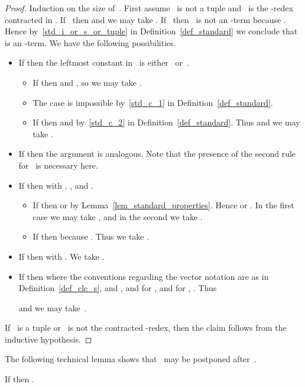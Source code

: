 \documentclass[a4paper,UKenglish]{lipics-v2016}
\begin{document}
\begin{proof}
  Induction on the size of~. First assume~ is not a tuple
  and~ is the -redex contracted in . If~ then  and we may take
  . If~ then~ is not an -term
  because . Hence by~\ref{std_i_or_s_or_tuple} in
  Definition~\ref{def_standard} we conclude that~ is an
  -term. We have the following possibilities.
  \begin{itemize}
  \item If  then the
    leftmost constant in~ is either~ or~.
    \begin{itemize}
    \item If  then  and
      , so we may take .
    \item The case  is impossible
      by~\ref{std_c_1} in Definition~\ref{def_standard}.
    \item If  then 
      and  by~\ref{std_c_2} in
      Definition~\ref{def_standard}. Thus  and we may
      take .
    \end{itemize}
  \item If  then the
    argument is analogous. Note that the presence of the second rule
    for~ is necessary here.
  \item If  then  with , ,
     and .
    \begin{itemize}
    \item If  then  or  by Lemma~\ref{lem_standard_properties}. Hence  or . In the first case we may
      take , and in the second we take .
    \item If  then  because
      . Thus we take .
    \end{itemize}
  \item If  then
     with . We
    take .
  \item If 
    then
     where the conventions regarding
    the vector notation are as in Definition~\ref{def_clc_s}, and
    , and  for
    , and  for ,
    . Thus
    
    and we may take~.
  \end{itemize}
  If~ is a tuple or~ is not the contracted -redex, then
  the claim follows from the inductive hypothesis.
\end{proof}

The following technical lemma shows that~ may be postponed
after~.

\begin{lemma}\label{lem_i_postpone}
  If  then
  .
\end{lemma}
\end{document}
